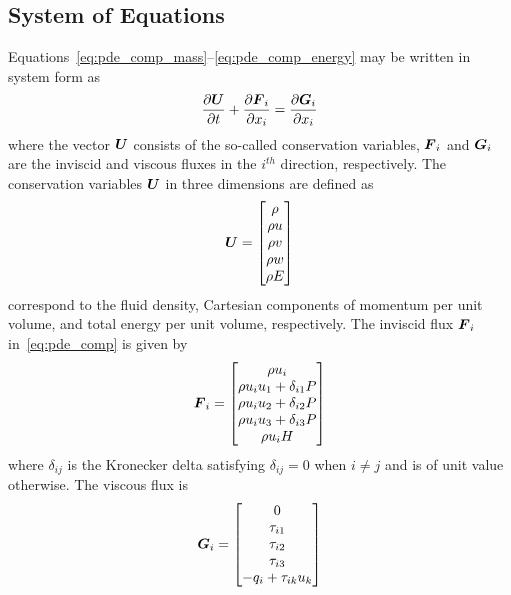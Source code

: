 \subsection{System of Equations}
Equations~\eqref{eq:pde_comp_mass}--\eqref{eq:pde_comp_energy} may be written in system form as
\begin{equation}
  \label{eq:pde_comp}
  {\frac{\partial{{\boldsymbol{U}}}}{\partial{t}}} + {\frac{\partial{{\boldsymbol{F}}_i}}{\partial{x_i}}} = {\frac{\partial{{\boldsymbol{G}}_i}}{\partial{x_i}}}
\end{equation}
where the vector ${\boldsymbol{U}}$ consists of the so-called conservation variables, ${\boldsymbol{F}}_i$ and ${\boldsymbol{G}}_i$ are the inviscid and viscous fluxes in the $i^{th}$ direction, respectively.  The conservation variables ${\boldsymbol{U}}$ in three dimensions are defined as
\begin{equation}
  {\boldsymbol{U}} =
  \begin{bmatrix}
    \rho   \\
    \rho u \\
    \rho v \\
    \rho w \\
    \rho E 
  \end{bmatrix}
\end{equation}
correspond to the fluid density, Cartesian components of momentum per unit volume, and total energy per unit volume, respectively. The inviscid flux ${\boldsymbol{F}}_i$ in~\eqref{eq:pde_comp} is given by
\begin{equation}
  {\boldsymbol{F}}_i =
  \begin{bmatrix}
    \rho u_i       \\
    \rho u_i u_1 + \delta_{i1} P \\
    \rho u_i u_2 + \delta_{i2} P \\
    \rho u_i u_3 + \delta_{i3} P \\
    \rho u_i H
  \end{bmatrix}
\end{equation}
where $\delta_{ij}$ is the Kronecker delta satisfying $\delta_{ij}=0$ when $i\neq j$ and is of unit value otherwise.  The viscous flux is
\begin{equation}
  {\boldsymbol{G}}_i =
  \begin{bmatrix}
    0         \\
    \tau_{i1} \\
    \tau_{i2} \\
    \tau_{i3} \\
    -q_i + \tau_{ik}u_k
  \end{bmatrix}
\end{equation}
